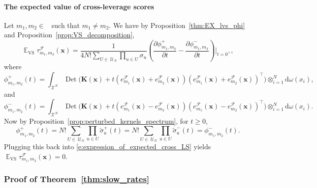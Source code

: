 \documentclass[twoside,11pt]{book}
\DeclareMathOperator{\Det}{Det}
\DeclareMathOperator{\VS}{\mathrm{VS}}
\DeclareMathOperator{\Tran}{\intercal}
\DeclareMathOperator{\EX}{\mathbb{E}}
\DeclareMathOperator{\F}{\mathcal{F}}
\DeclareMathOperator{\Ns}{\mathbb{N}^{*}}
\def\UN{\:\mathcal{U}_N}
\newcommand{\rb}[1]{\textcolor{magenta}{#1}}
\begin{document}
\paragraph{The expected value of cross-leverage scores}
Let $m_{1},m_{2} \in \Ns$ such that $m_{1} \neq m_{2}$. We have by Proposition~\ref{thm:EX_lvs_phi} and Proposition~\ref{prop:VS_decomposition},
\begin{equation}
\EX_{\VS} \tau_{m_{1},m_{2}}^{\F}(\bm{x})  = \frac{1}{4N!\sum\limits_{U\in\UN} \prod\limits_{u \in U}\sigma_{u}} \left( \frac{\partial \phi_{m_{1},m_{2}}^{+}}{ \partial t } - \frac{\partial \phi_{m_{1},m_{2}}^{-}}{ \partial t }\right)\bigg|_{t = 0^{+}} ,
\label{e:expression_of_expected_cross_LS}
\end{equation}
where
\begin{equation}
\phi_{m_{1},m_{2}}^{+}(t) =  \int_{\mathcal{X}^{N}} \Det \bigg(\bm{K}(\bm{x})+t \left(e_{m_{1}}^{\mathcal{F}}(\bm{x}) + e_{m_{2}}^{\mathcal{F}}(\bm{x}) \right) \left(e_{m_{1}}^{\mathcal{F}}(\bm{x}) + e_{m_{2}}^{\mathcal{F}}(\bm{x}) \right)^{\Tran} \bigg) \otimes_{i =1}^{N} \mathrm{d}\omega(x_{i}),
\end{equation}
and
\begin{equation}
\phi_{m_{1},m_{2}}^{-}(t) =  \int_{\mathcal{X}^{N}} \Det \bigg(\bm{K}(\bm{x})+t \left(e_{m_{1}}^{\mathcal{F}}(\bm{x}) - e_{m_{2}}^{\mathcal{F}}(\bm{x}) \right) \left(e_{m_{1}}^{\mathcal{F}}(\bm{x}) - e_{m_{2}}^{\mathcal{F}}(\bm{x}) \right)^{\Tran} \bigg) \otimes_{i =1}^{N} \mathrm{d}\omega(x_{i}).
\end{equation}
Now by Proposition~\ref{prop:perturbed_kernels_spectrum}, for $t\geq 0$,
\begin{equation}
\phi_{m_{1},m_{2}}^{+}(t) = N!\sum\limits_{U\in\UN} \prod\limits_{u \in U} \tilde{\sigma}_{u}^{+}(t) = N!\sum\limits_{U\in\UN} \prod\limits_{u \in U} \tilde{\sigma}_{u}^{-}(t) = \phi_{m_{1},m_{2}}^{-}(t).
\end{equation}
Plugging this back into \eqref{e:expression_of_expected_cross_LS} yields $\EX_{\VS} \tau_{m_{1},m_{2}}^{\F}(\bm{x}) = 0$.

\subsubsection{Proof of Theorem~\ref{thm:slow_rates}}\label{app:proof_slow_rates}
\end{document}
